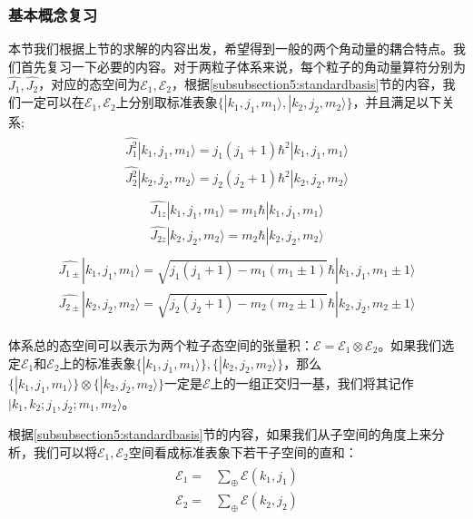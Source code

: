         \subsubsection{基本概念复习}
        本节我们根据上节的求解的内容出发，希望得到一般的两个角动量的耦合特点。我们首先复习一下必要的内容。对于两粒子体系来说，每个粒子的角动量算符分别为$\hat{J_1},\hat{J_2}$，对应的态空间为$\mathcal{E}_1,\mathcal{E}_2$，根据\ref{subsubsection5:standardbasis}节的内容，我们一定可以在$\mathcal{E}_1,\mathcal{E}_2$上分别取标准表象$\{|k_1,j_1,m_1\rangle,|k_2,j_2,m_2\rangle\}$，并且满足以下关系;
     \begin{align}
         \begin{split}
            \hat{J_1^2}|k_1,j_1,m_1\rangle= j_1(j_1+1)\hbar^2|k_1,j_1,m_1\rangle\\
            \hat{J_2^2}|k_2,j_2,m_2\rangle= j_2(j_2+1)\hbar^2|k_2,j_2,m_2\rangle
         \end{split}
     \end{align}
     \begin{align}
         \begin{split}
            \widehat{J_{1z}}|k_1,j_1,m_1\rangle=m_1\hbar|k_1,j_1,m_1\rangle\\
            \widehat{J_{2z}}|k_2,j_2,m_2\rangle= m_2\hbar|k_2,j_2,m_2\rangle
         \end{split}
     \end{align}
     \begin{align}
         \begin{split}
            \widehat{J_{1\pm}}|k_1,j_1,m_1\rangle =\sqrt{j_1(j_1+1)- m_1(m_1\pm1)}\hbar|k_1,j_1,m_1\pm1\rangle\\
             \widehat{J_{2\pm}}|k_2,j_2,m_2\rangle =\sqrt{j_2(j_2+1)- m_2(m_2\pm1)}\hbar|k_2,j_2,m_2\pm1\rangle 
         \end{split}
     \end{align}
    
    体系总的态空间可以表示为两个粒子态空间的张量积：$\mathcal{E}=\mathcal{E}_1\otimes\mathcal{E}_2$。如果我们选定$\mathcal{E}_1\textrm{和}\mathcal{E}_2$上的标准表象$\{|k_1,j_1,m_1\rangle\},\{|k_2,j_2,m_2\rangle\}$，那么$\{|k_1,j_1,m_1\rangle\}\otimes\{|k_2,j_2,m_2\rangle\}$一定是$\mathcal{E}$上的一组正交归一基，我们将其记作$|k_1,k_2;j_1,j_2;m_1,m_2\rangle$。
    
    根据\ref{subsubsection5:standardbasis}节的内容，如果我们从子空间的角度上来分析，我们可以将$\mathcal{E}_1,\mathcal{E}_2$空间看成标准表象下若干子空间的直和：
    \begin{align}
    \begin{split}
        \mathcal{E}_1=&\sum_{\oplus}\mathcal{E}(k_1,j_1)\\
         \mathcal{E}_2=&\sum_{\oplus}\mathcal{E}(k_2,j_2)
    \end{split}
    \end{align}
    
